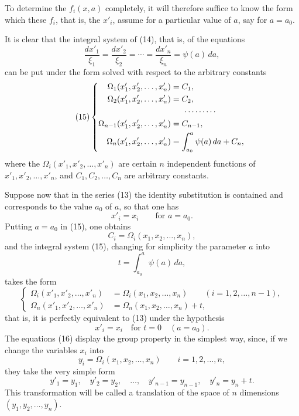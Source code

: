 \documentclass[11pt]{book}
\begin{document}
To determine the $f_i(x,a)$ completely, it will therefore suffice to know the form which these $f_i$, that is, the $x'_i$, assume for a particular value of $a$, say for $a=a_0$.

It is clear that the integral system of (14), that is, of the equations
\[
 \frac{dx'_1}{\xi_1}=\frac{dx'_2}{\xi_2}=\cdots=\frac{dx'_n}{\xi_n}=\psi(a)\,da,
\]
can be put under the form solved with respect to the arbitrary constants
\begin{equation*}\tag{15}
\left\{
\begin{aligned}
 \Omega_1(x'_1,x'_2,\ldots,x'_n)&=C_1,\\
 \Omega_2(x'_1,x'_2,\ldots,x'_n)&=C_2,\\
 &\hspace{1.5em}\cdots\cdots\cdots\\
 \Omega_{n-1}(x'_1,x'_2,\ldots,x'_n)&=C_{n-1},\\
 \Omega_n(x'_1,x'_2,\ldots,x'_n)&=\int_{a_0}^{a}\psi(a)\,da+C_n,
\end{aligned}
\right.
\end{equation*}
where the $\Omega_i(x'_1,x'_2,\ldots,x'_n)$ are certain $n$ independent functions of $x'_1,x'_2,\ldots,x'_n$, and $C_1,C_2,\ldots,C_n$ are arbitrary constants.

Suppose now that in the series (13) the identity substitution is contained and corresponds to the value $a_0$ of $a$, so that one has
\[
 x'_i=x_i\qquad\text{for }a=a_0.
\]
Putting $a=a_0$ in (15), one obtains
\[
 C_i=\Omega_i(x_1,x_2,\ldots,x_n),
\]
and the integral system (15), changing for simplicity the parameter $a$ into
\[
 t=\int_{a_0}^{a}\psi(a)\,da,
\]
takes the form
\begin{equation*}\tag{16}
\left\{
\begin{aligned}
 \Omega_i(x'_1,x'_2,\ldots,x'_n)&=\Omega_i(x_1,x_2,\ldots,x_n)\qquad (i=1,2,\ldots,n-1),\\
 \Omega_n(x'_1,x'_2,\ldots,x'_n)&=\Omega_n(x_1,x_2,\ldots,x_n)+t,
\end{aligned}
\right.
\end{equation*}
that is, it is perfectly equivalent to (13) under the hypothesis
\[
 x'_i=x_i\quad\text{for }t=0\quad (a=a_0).
\]
The equations (16) display the group property in the simplest way, since, if we change the variables $x_i$ into
\[
 y_i=\Omega_i(x_1,x_2,\ldots,x_n)\qquad i=1,2,\ldots,n,
\]
they take the very simple form
\[
 y'_1=y_1,\quad y'_2=y_2,\quad\ldots,\quad y'_{n-1}=y_{n-1},\quad y'_n=y_n+t.
\]
This transformation will be called a translation of the space of $n$ dimensions $(y_1,y_2,\ldots,y_n)$.
\end{document}
